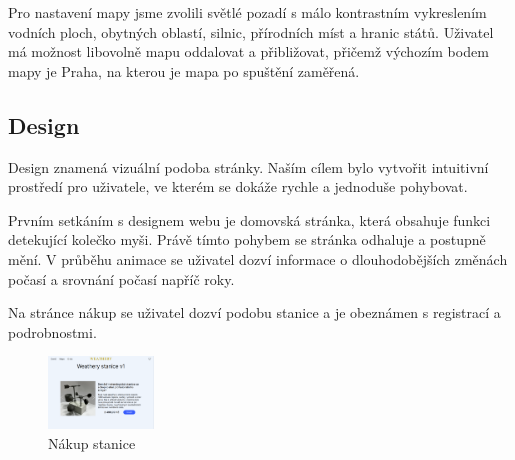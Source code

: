 Pro nastavení mapy jsme zvolili světlé pozadí s málo kontrastním vykreslením vodních ploch, obytných oblastí, silnic, přírodních míst a hranic států. Uživatel má možnost libovolně mapu oddalovat a přibližovat, přičemž výchozím bodem mapy je Praha, na kterou je mapa po spuštění zaměřená.

\subsection{Design}
Design znamená vizuální podoba stránky.
Naším cílem bylo vytvořit intuitivní prostředí pro uživatele, ve kterém se dokáže rychle a jednoduše pohybovat.

Prvním setkáním s designem webu je domovská stránka, která obsahuje funkci detekující kolečko myši.
Právě tímto pohybem se stránka odhaluje a postupně mění. V průběhu animace se uživatel dozví informace o dlouhodobějších změnách počasí a srovnání počasí napříč roky.

Na stránce nákup se uživatel dozví podobu stanice a je obeznámen s registrací a podrobnostmi.

\begin{figure}[h] %
    \centering
    \includegraphics[width=0.25\textwidth]{images/nakup.png}
    \caption{Nákup stanice}
    \label{nakup}
\end{figure}
